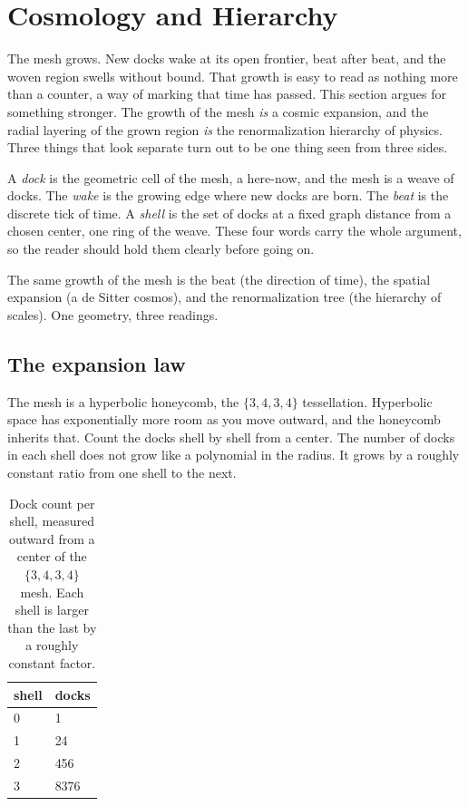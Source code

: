 \section{Cosmology and Hierarchy}

The mesh grows. New docks wake at its open frontier, beat after beat, and the woven region swells without bound. That growth is easy to read as nothing more than a counter, a way of marking that time has passed. This section argues for something stronger. The growth of the mesh \emph{is} a cosmic expansion, and the radial layering of the grown region \emph{is} the renormalization hierarchy of physics. Three things that look separate turn out to be one thing seen from three sides.

A \emph{dock} is the geometric cell of the mesh, a here-now, and the mesh is a weave of docks. The \emph{wake} is the growing edge where new docks are born. The \emph{beat} is the discrete tick of time. A \emph{shell} is the set of docks at a fixed graph distance from a chosen center, one ring of the weave. These four words carry the whole argument, so the reader should hold them clearly before going on.

\begin{principle}
The same growth of the mesh is the beat (the direction of time), the spatial expansion (a de Sitter cosmos), and the renormalization tree (the hierarchy of scales). One geometry, three readings.
\end{principle}

\subsection{The expansion law}

The mesh is a hyperbolic honeycomb, the $\{3,4,3,4\}$ tessellation. Hyperbolic space has exponentially more room as you move outward, and the honeycomb inherits that. Count the docks shell by shell from a center. The number of docks in each shell does not grow like a polynomial in the radius. It grows by a roughly constant ratio from one shell to the next.

\begin{table}[ht]
\centering
\begin{tabular}{@{}ll@{}}
\toprule
shell & docks \\
\midrule
0 & 1 \\
1 & 24 \\
2 & 456 \\
3 & 8376 \\
\bottomrule
\end{tabular}
\caption{Dock count per shell, measured outward from a center of the $\{3,4,3,4\}$ mesh. Each shell is larger than the last by a roughly constant factor.}
\label{tab:shell-counts}
\end{table}

